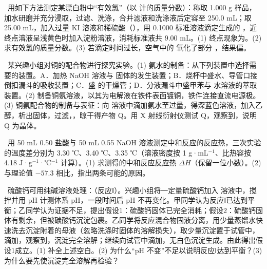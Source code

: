 \begin{xiti}
\item {}\ 用如下方法测定某漂白粉中“有效氯”（以  计的质量分数）：称取 1.000 g 样品，加水研磨并充分浸取，过滤、洗涤，合并滤液和洗涤液后定容至 250.0 mL；取 25.00 mL，加入过量 KI 溶液和稀硫酸（），用 0.1000\molL{}  标准溶液滴定生成的 ，近终点溶液呈浅黄色时加入淀粉溶液，消耗标准液共 9.00 mL。(1) 终点现象为\tk。(2) 求有效氯的质量分数。(3) 若滴定时间过长，空气中的  氧化了部分 ，结果偏\tk。

\item {}\ 某兴趣小组对铜的配合物进行探究实验。(1) 氨水的制备：从下列装置中选择需要的装置\tk。A．加热 NaOH 溶液与  固体的发生装置；B．烧杯中盛水、导管口接倒扣漏斗的吸收装置；C．盛  的干燥管；D．分液漏斗中盛甲苯与  水溶液的萃取装置。(2) 制备铜氨溶液，以其为电解液在铁件表面镀铜，铁件连接直流电源\tk{}极。(3) 铜氨配合物的制备与表征：向  溶液中滴加氨水至过量，得深蓝色溶液，加入乙醇，析出固体，过滤，\tk，晾干得产物 Q。用 X 射线衍射仪测试 Q，观察到\tk，说明 Q 为晶体。

\item {}\ 用 50 mL 0.50\molL{} 盐酸与 50 mL 0.55\molL{} NaOH 溶液测定中和反应的反应热，三次实验的温度差分别为 3.30 ℃、3.40 ℃、3.35 ℃（溶液密度按 1 g·mL$^{-1}$、比热容按 4.18 J·g$^{-1}$·℃$^{-1}$ 计算）。(1) 求测得的中和反应反应热 $\Delta H$（保留一位小数）。(2) 与理论值 $-57.3$\kjmol{} 相比，指出两条可能的原因。

\item {}\ 硫酸钙可用纯碱溶液处理：（反应Ⅰ）。兴趣小组将一定量硫酸钙加入  溶液中，搅拌并用 pH 计测体系 pH，一段时间后 pH 不再变化。甲同学认为反应Ⅰ已达到平衡；乙同学认为证据不足，提出假设1：硫酸钙固体已完全消耗；假设2：硫酸钙固体有剩余，但被碳酸钙沉淀包裹。乙同学将反应混合物固液分离，用少量蒸馏水快速洗去沉淀附着的母液（忽略洗涤时固体的溶解损失），取少量沉淀置于试管中，滴加\tk，观察到\tk，沉淀完全溶解；继续向试管中滴加\tk，无白色沉淀生成。由此得出假设1成立。(1) 补全上述空白。(2) 为什么“pH 不变”不足以说明反应Ⅰ达到平衡？(3) 为什么要先使沉淀完全溶解再检验？
\end{xiti}

